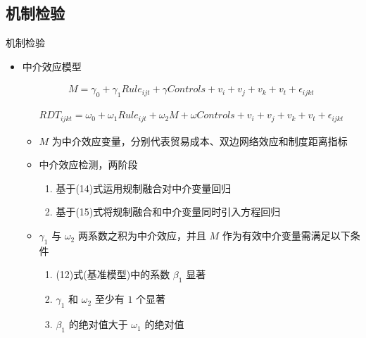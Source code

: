 \documentclass{beamer}
\begin{document}
\subsection{机制检验}
\begin{frame}{机制检验}
    \begin{itemize}
        \item 中介效应模型
        \begin{footnotesize}
            \begin{gather*}
                M=\gamma_0+\gamma_1 Rule_{ijt}+\gamma Controls+v_i+v_j+v_k+v_t+\epsilon_{ijkt} \tag{14}
            \end{gather*}
        \end{footnotesize}
        \vspace*{-2em}
        \begin{scriptsize}
            \begin{gather*}
                RDT_{ijkt}=\omega_0+\omega_1 Rule_{ijt}+\omega_2 M+\omega Controls+v_i+v_j+v_k+v_t+\epsilon_{ijkt} \tag{15}
            \end{gather*}
        \end{scriptsize}
        \vspace*{-1em}
        \begin{itemize}
            \item $M$ 为中介效应变量，分别代表贸易成本、双边网络效应和制度距离指标
            \item 中介效应检测，两阶段
            \begin{enumerate}
                \item 基于(14)式运用规制融合对中介变量回归
                \item 基于(15)式将规制融合和中介变量同时引入方程回归
            \end{enumerate}
            \item $\gamma_1$ 与 $\omega_2$ 两系数之积为中介效应，并且 $M$ 作为有效中介变量需满足以下条件
            \begin{enumerate}
                \item (12)式(基准模型)中的系数 $\beta_1$ 显著
                \item $\gamma_1$ 和 $\omega_2$ 至少有 $1$ 个显著
                \item $\beta_1$ 的绝对值大于 $\omega_1$ 的绝对值
            \end{enumerate}
        \end{itemize}
    \end{itemize}
\end{frame}
\end{document}
